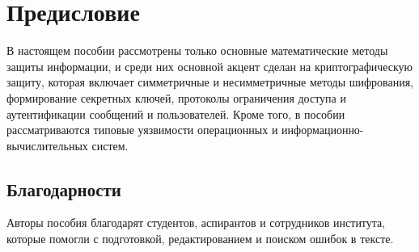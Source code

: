 \chapter*{Предисловие}

В настоящем пособии рассмотрены только основные математические методы защиты информации, и среди них основной акцент сделан на криптографическую защиту, которая включает симметричные и несимметричные методы шифрования, формирование секретных ключей, протоколы ограничения доступа и аутентификации сообщений и пользователей. Кроме того, в пособии рассматриваются типовые уязвимости операционных и информационно-вычислительных систем.

\section*{Благодарности}
Авторы пособия благодарят студентов, аспирантов и сотрудников института, которые помогли с подготовкой, редактированием и поиском ошибок в тексте.

